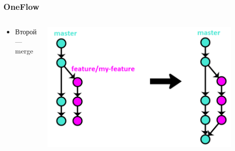 \documentclass{../../slides-style}
\begin{document}
    \begin{frame}
        \frametitle{OneFlow}
        \begin{columns}
            \begin{column}{0.4\textwidth}
                \begin{itemize}
                    \item Второй --- merge
                \end{itemize}
            \end{column}
            \begin{column}{0.6\textwidth}
                \begin{center}
                    \includegraphics[width=0.9\textwidth]{oneflow2.png}
                \end{center}
            \end{column}
        \end{columns}
    \end{frame}
\end{document}
